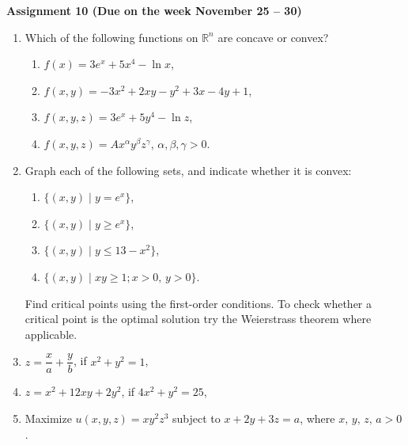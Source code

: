 \documentclass{article}
\begin{document}
\fontsize{14}{21}
\selectfont
\centerline{\textbf{Assignment 10 (Due on the week November 25 -- 30)}}
\fontsize{12}{18}
\selectfont
\begin{enumerate}
\item Which of the following functions on $\mathbb{R}^n$ are concave or convex?
\begin{enumerate}
\item $f(x)=3e^x+5x^4-\ln x$,
\item $f(x, y)=-3x^2+2xy-y^2+3x-4y+1$,
\item $f(x,y,z)=3e^x+5y^4-\ln z$,
\item $f(x,y,z)=Ax^\alpha y^\beta z^\gamma$, $\alpha,\beta,\gamma>0$.
\end{enumerate}
\item Graph each of the following sets, and indicate whether it is convex:
\begin{enumerate}
\item $\{(x,y)\;|\; y=e^x\}$,
\item $\{(x,y)\;|\; y\geqslant e^x\}$,
\item $\{(x,y)\;|\;y\leqslant 13-x^2\}$,
\item $\{(x,y)\;|\; xy\geqslant 1; x>0,\, y>0\}$.
\end{enumerate}

\medskip
Find critical points using the first-order conditions. To check whether a critical point is the optimal solution try the Weierstrass theorem where applicable.
\item $z=\dfrac xa+\dfrac yb$, if $x^2+y^2=1$,
\item $z=x^2+12xy+2y^2$, if $4x^2+y^2=25$,
\item Maximize $u(x,y,z)=xy^2z^3$ subject to $x+2y+3z=a$, where $x,\,y,\,z,\,a>0$.
\end{enumerate}
\end{document}
